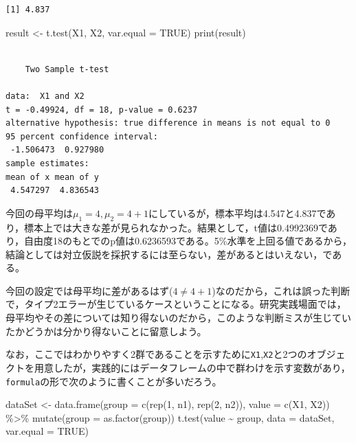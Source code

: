\documentclass[
  a4paper,
]{ltjsbook}
\newenvironment{Shaded}{\begin{snugshade}}{\end{snugshade}}
\newcommand{\AttributeTok}[1]{\textcolor[rgb]{0.40,0.45,0.13}{#1}}
\newcommand{\ConstantTok}[1]{\textcolor[rgb]{0.56,0.35,0.01}{#1}}
\newcommand{\DecValTok}[1]{\textcolor[rgb]{0.68,0.00,0.00}{#1}}
\newcommand{\FunctionTok}[1]{\textcolor[rgb]{0.28,0.35,0.67}{#1}}
\newcommand{\NormalTok}[1]{\textcolor[rgb]{0.00,0.23,0.31}{#1}}
\newcommand{\OtherTok}[1]{\textcolor[rgb]{0.00,0.23,0.31}{#1}}
\newcommand{\SpecialCharTok}[1]{\textcolor[rgb]{0.37,0.37,0.37}{#1}}
\begin{document}
\begin{verbatim}
[1] 4.837
\end{verbatim}

\begin{Shaded}
\begin{Highlighting}[]
\NormalTok{result }\OtherTok{\textless{}{-}} \FunctionTok{t.test}\NormalTok{(X1, X2, }\AttributeTok{var.equal =} \ConstantTok{TRUE}\NormalTok{)}
\FunctionTok{print}\NormalTok{(result)}
\end{Highlighting}
\end{Shaded}

\begin{verbatim}

    Two Sample t-test

data:  X1 and X2
t = -0.49924, df = 18, p-value = 0.6237
alternative hypothesis: true difference in means is not equal to 0
95 percent confidence interval:
 -1.506473  0.927980
sample estimates:
mean of x mean of y 
 4.547297  4.836543 
\end{verbatim}

今回の母平均は\(\mu_1 = 4, \mu_2 = 4+1\)にしているが，標本平均は4.547と4.837であり，標本上では大きな差が見られなかった。結果として，t値は0.4992369であり，自由度18のもとでのp値は0.6236593である。5\%水準を上回る値であるから，結論としては対立仮説を採択するには至らない，差があるとはいえない，である。

今回の設定では母平均に差があるはず(\(4 \neq 4 + 1\))なのだから，これは誤った判断で，タイプ2エラーが生じているケースということになる。研究実践場面では，母平均やその差については知り得ないのだから，このような判断ミスが生じていたかどうかは分かり得ないことに留意しよう。

なお，ここではわかりやすく2群であることを示すために\texttt{X1},\texttt{X2}と2つのオブジェクトを用意したが，実践的にはデータフレームの中で群わけを示す変数があり，\texttt{formula}の形で次のように書くことが多いだろう。

\begin{Shaded}
\begin{Highlighting}[]
\NormalTok{dataSet }\OtherTok{\textless{}{-}} \FunctionTok{data.frame}\NormalTok{(}\AttributeTok{group =} \FunctionTok{c}\NormalTok{(}\FunctionTok{rep}\NormalTok{(}\DecValTok{1}\NormalTok{, n1), }\FunctionTok{rep}\NormalTok{(}\DecValTok{2}\NormalTok{, n2)), }\AttributeTok{value =} \FunctionTok{c}\NormalTok{(X1, X2)) }\SpecialCharTok{\%\textgreater{}\%}
  \FunctionTok{mutate}\NormalTok{(}\AttributeTok{group =} \FunctionTok{as.factor}\NormalTok{(group))}
\FunctionTok{t.test}\NormalTok{(value }\SpecialCharTok{\textasciitilde{}}\NormalTok{ group, }\AttributeTok{data =}\NormalTok{ dataSet, }\AttributeTok{var.equal =} \ConstantTok{TRUE}\NormalTok{)}
\end{Highlighting}
\end{Shaded}
\end{document}
